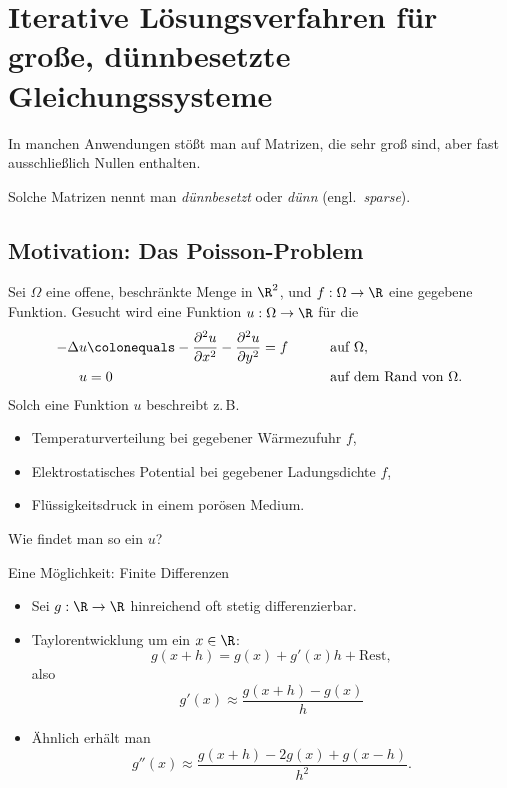\chapter{Iterative Lösungsverfahren für große, dünnbesetzte Gleichungssysteme}

In manchen Anwendungen stößt man auf Matrizen, die sehr groß sind, aber fast ausschließlich
Nullen enthalten.

Solche Matrizen nennt man \emph{dünnbesetzt} oder \emph{dünn} (engl.\ \emph{sparse}).

\section{Motivation: Das Poisson-Problem}

Sei $\Omega$ eine offene, beschränkte Menge in $\R^2$, und $f : \Omega \to \R$ eine gegebene Funktion.
Gesucht wird eine Funktion $u : \Omega \to \R$ für die
\begin{alignat*}{2}
 -\Delta u & \colonequals - \frac{\partial^2 u}{\partial x^2} - \frac{\partial^2 u}{\partial y^2} = f
 & \qquad & \text{auf $\Omega$}, \\
 u & = 0 && \text{auf dem Rand von $\Omega$}.
\end{alignat*}
Solch eine Funktion $u$ beschreibt z.\,B.
\begin{itemize}
 \item Temperaturverteilung bei gegebener Wärmezufuhr $f$,
 \item Elektrostatisches Potential bei gegebener Ladungsdichte $f$,
 \item Flüssigkeitsdruck in einem porösen Medium.
\end{itemize}

Wie findet man so ein $u$?

Eine Möglichkeit: Finite Differenzen
\begin{itemize}
 \item Sei $g : \R \to \R$ hinreichend oft stetig differenzierbar.
 \item Taylorentwicklung um ein $x \in \R$:
 \begin{equation*}
  g(x + h) = g(x) + g'(x)h + \text{Rest},
 \end{equation*}
 also
 \begin{equation*}
  g'(x) \approx \frac{g(x+h) - g(x)}{h}
 \end{equation*}
 \item Ähnlich erhält man
 \begin{equation*}
  g''(x)
  \approx
  \frac{g(x+h) - 2g(x) + g(x-h)}{h^2}.
 \end{equation*}
\end{itemize}

